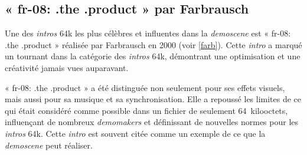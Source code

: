 \subsection*{« fr-08: .the .product » par Farbrausch}

Une des \textit{intros} 64k les plus célèbres et influentes dans la \textit{demoscene} est « fr-08: .the .product » réalisée par Farbrausch en 2000 (voir \ref{farb}). Cette \textit{intro} a marqué un tournant dans la catégorie des \textit{intros} 64k, démontrant une optimisation et une créativité jamais vues auparavant.

« fr-08: .the .product » a été distinguée non seulement pour ses effets visuels, mais aussi pour sa musique et sa synchronisation. Elle a repoussé les limites de ce qui était considéré comme possible dans un fichier de seulement 64~kilooctets, influençant de nombreux \textit{demomakers} et définissant de nouvelles normes pour les \textit{intros} 64k. Cette \textit{intro} est souvent citée comme un exemple de ce que la \textit{demoscene} peut réaliser.


